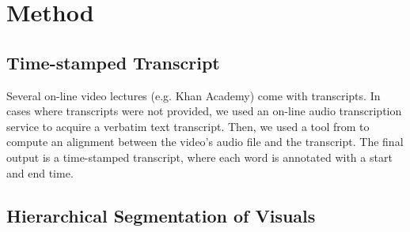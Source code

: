 \section{Method}
\subsection{Time-stamped Transcript}
Several on-line video lectures (e.g. Khan Academy) come with transcripts. In cases where transcripts were not provided, we used an on-line audio transcription service to acquire a verbatim text transcript. Then, we used a tool from \cite{rubin2013content} to compute an alignment between the video's audio file and the transcript. The final output is a time-stamped transcript, where each word is annotated with a start and end time.
  
\subsection{Hierarchical Segmentation of Visuals}
